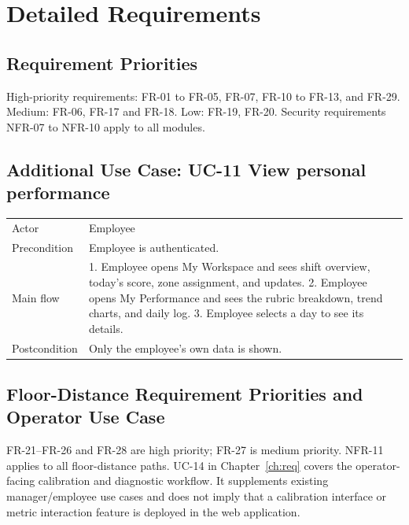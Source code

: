 \chapter{Detailed Requirements}
\section{Requirement Priorities}
High-priority requirements: FR-01 to FR-05, FR-07, FR-10 to FR-13, and FR-29. Medium: FR-06, FR-17 and FR-18. Low: FR-19, FR-20. Security requirements NFR-07 to NFR-10 apply to all modules.

\section{Additional Use Case: UC-11 View personal performance}
\begin{tabular}{P{0.22\textwidth}P{0.68\textwidth}}
\toprule
Actor & Employee\\
Precondition & Employee is authenticated.\\
Main flow & 1. Employee opens My Workspace and sees shift overview, today's score, zone assignment, and updates. 2. Employee opens My Performance and sees the rubric breakdown, trend charts, and daily log. 3. Employee selects a day to see its details.\\
Postcondition & Only the employee's own data is shown.\\
\bottomrule
\end{tabular}

\section{Floor-Distance Requirement Priorities and Operator Use Case}
FR-21--FR-26 and FR-28 are high priority; FR-27 is medium priority. NFR-11 applies to all floor-distance paths. UC-14 in Chapter~\ref{ch:req} covers the operator-facing calibration and diagnostic workflow. It supplements existing manager/employee use cases and does not imply that a calibration interface or metric interaction feature is deployed in the web application.
